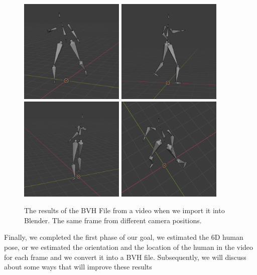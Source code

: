 \begin{figure}[htp]
    \centering
    \includegraphics[width=5cm]{figures/Implementation/skeleton1.png}%
    \qquad
    \includegraphics[width=5cm]{figures/Implementation/skeleton2.png}%
    \qquad
    \includegraphics[width=5cm]{figures/Implementation/skeleton3.png}%
    \qquad
    \includegraphics[width=5cm]{figures/Implementation/skeleton4.png}%
    \captionsetup{labelformat=empty}
    \caption{The results of the BVH File from a video when we import it into Blender. The same frame from different camera positions.}%
    \label{fig:example}%
\end{figure}

Finally, we completed the first phase of our goal, we estimated the 6D human pose, or we estimated the orientation and the location of the human in the video for each frame and we convert it into a BVH file. Subsequently, we will discuss about some ways that will improve these results 


